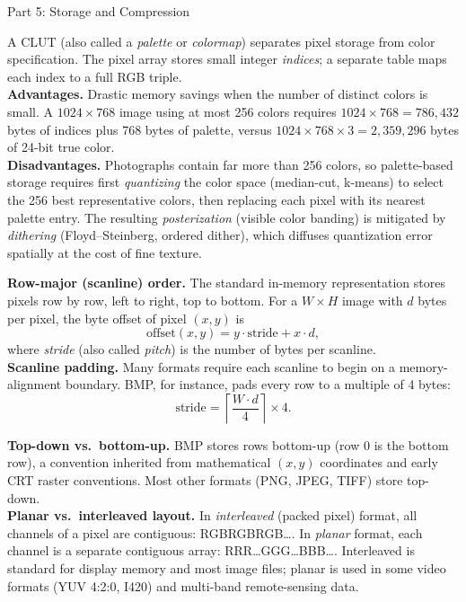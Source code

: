 \documentclass[letterpaper]{article}
\begin{document}
\begin{notes}{Part 5: Storage and Compression}

A CLUT (also called a \emph{palette} or \emph{colormap}) separates pixel storage from color specification. The pixel array stores small integer \emph{indices}; a separate table maps each index to a full RGB triple.\\

\textbf{Advantages.} Drastic memory savings when the number of distinct colors is small. A $1024\times768$ image using at most 256 colors requires $1024\times768=786{,}432$ bytes of indices plus 768 bytes of palette, versus $1024\times768\times3=2{,}359{,}296$ bytes of 24-bit true color.\\

\textbf{Disadvantages.} Photographs contain far more than 256 colors, so palette-based storage requires first \emph{quantizing} the color space (median-cut, k-means) to select the 256 best representative colors, then replacing each pixel with its nearest palette entry. The resulting \emph{posterization} (visible color banding) is mitigated by \emph{dithering} (Floyd--Steinberg, ordered dither), which diffuses quantization error spatially at the cost of fine texture.


\textbf{Row-major (scanline) order.} The standard in-memory representation stores pixels row by row, left to right, top to bottom. For a $W\times H$ image with $d$ bytes per pixel, the byte offset of pixel $(x,y)$ is
$$\text{offset}(x,y)=y\cdot\text{stride}+x\cdot d,$$
where \emph{stride} (also called \emph{pitch}) is the number of bytes per scanline.\\

\textbf{Scanline padding.} Many formats require each scanline to begin on a memory-alignment boundary. BMP, for instance, pads every row to a multiple of 4 bytes:
$$\text{stride}=\left\lceil\frac{W\cdot d}{4}\right\rceil\times 4.$$

\textbf{Top-down vs.\ bottom-up.} BMP stores rows bottom-up (row 0 is the bottom row), a convention inherited from mathematical $(x,y)$ coordinates and early CRT raster conventions. Most other formats (PNG, JPEG, TIFF) store top-down.\\

\textbf{Planar vs.\ interleaved layout.} In \emph{interleaved} (packed pixel) format, all channels of a pixel are contiguous: RGBRGBRGB\ldots. In \emph{planar} format, each channel is a separate contiguous array: RRR\ldots GGG\ldots BBB\ldots. Interleaved is standard for display memory and most image files; planar is used in some video formats (YUV 4:2:0, I420) and multi-band remote-sensing data.


\end{notes}
\end{document}
